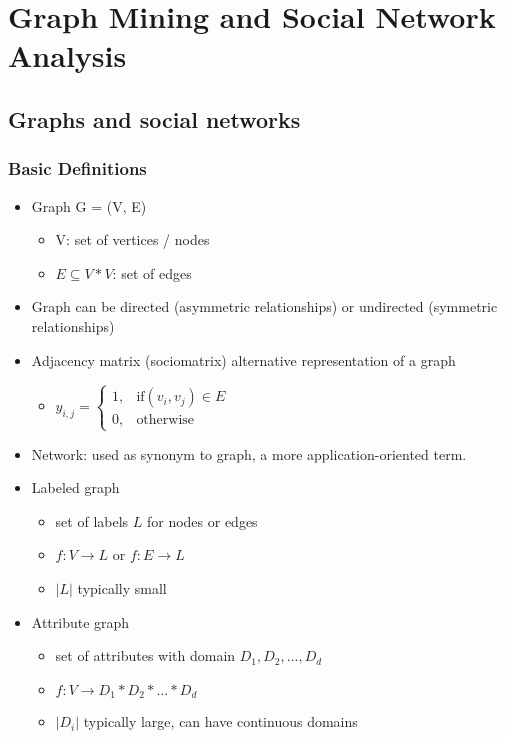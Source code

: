 \documentclass[../notes.tex]{subfiles}
\begin{document}
\section{Graph Mining and Social Network Analysis}

\subsection{Graphs and social networks}

\subsubsection{Basic Definitions}

\begin{itemize}
  \item Graph G = (V, E)
  \begin{itemize}
    \item V: set of vertices / nodes
    \item $E \subseteq V*V$: set of edges
  \end{itemize}

  \item Graph can be directed (asymmetric relationships) or undirected (symmetric relationships)

  \item Adjacency matrix (sociomatrix) alternative representation of a graph
  \begin{itemize}
    \item $y_{i, j} = 
  \begin{cases}
    1, & \text{if} (v_i, v_j) \in E \\
    0,              & \text{otherwise}
  \end{cases}$ 
  \end{itemize}

  \item Network: used as synonym to graph, a more application-oriented term.

  \item Labeled graph
  \begin{itemize}
    \item set of labels $L$ for nodes or edges
    \item $f: V \rightarrow L$ or $f: E \rightarrow L$
    \item $|L|$ typically small
  \end{itemize}

  \item Attribute graph
  \begin{itemize}
    \item set of attributes with domain $D_1, D_2, ..., D_d$
    \item $f: V \rightarrow D_1 * D_2 * ... * D_d$
    \item $|D_i|$ typically large, can have continuous domains
  \end{itemize}


\end{itemize}
\end{document}
